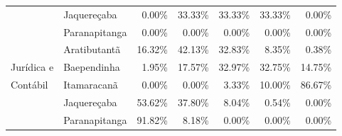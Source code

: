 \begin{table}[h]
\begin{tabular}{ll rrrrr}
                          & Jaquereçaba             &               0.00\% &        33.33\% &       33.33\% &      33.33\% &             0.00\% \\ 
                          & Paranapitanga           &               0.00\% &         0.00\% &        0.00\% &       0.00\% &             0.00\% \\ 
 \midrule{}                                                                                                                          
						  & Aratibutantã            &              16.32\% &        42.13\% &       32.83\% &       8.35\% &             0.38\% \\ 
    Jurídica e         	  & Baependinha             &               1.95\% &        17.57\% &       32.97\% &      32.75\% &            14.75\% \\ 
	Contábil			  & Itamaracanã             &               0.00\% &         0.00\% &        3.33\% &      10.00\% &            86.67\% \\ 
						  & Jaquereçaba             &              53.62\% &        37.80\% &        8.04\% &       0.54\% &             0.00\% \\ 
                          & Paranapitanga           &              91.82\% &         8.18\% &        0.00\% &       0.00\% &             0.00\% \\ 
   \bottomrule
\end{tabular}
\end{table}

